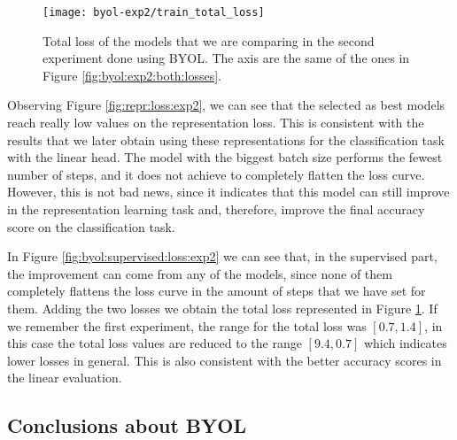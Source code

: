 \begin{figure}[H]
\centering
\texttt{[image: byol-exp2/train\_total\_loss]}%
\caption{Total loss of the models that we are comparing in the second experiment done using BYOL. The axis are the same of the ones in Figure \ref{fig:byol:exp2:both:losses}. }
\label{fig:byol:total:loss:exp2}%
\end{figure}

Observing Figure \ref{fig:repr:loss:exp2}, we can see that the selected as best models reach really low values on the representation loss. This is consistent with the results that we later obtain using these representations for the classification task with the linear head. The model with the biggest batch size performs the fewest number of steps, and it does not achieve to completely flatten the loss curve. However, this is not bad news, since it indicates that this model can still improve in the representation learning task and, therefore, improve the final accuracy score on the classification task.

In Figure \ref{fig:byol:supervised:loss:exp2} we can see that, in the supervised part, the improvement can come from any of the models, since none of them completely flattens the loss curve in the amount of steps that we have set for them. Adding the two losses we obtain the total loss represented in Figure \ref{fig:byol:total:loss:exp2}. If we remember the first experiment, the range for the total loss was $[0.7,1.4]$, in this case the total loss values are reduced to the range $[9.4,0.7]$ which indicates lower losses in general. This is also consistent with the better accuracy scores in the linear evaluation.


\subsection{Conclusions about BYOL}
